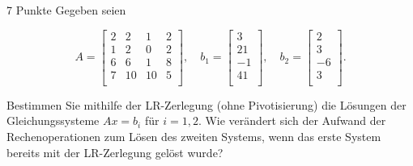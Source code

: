 \documentclass{problemset}
\author{Michael van Straten}
\begin{document}
\maketitle

\setcounter{problem}{3}

\begin{problem}{7 Punkte}
Gegeben seien

\[
    A =
    \begin{bmatrix}
        2 & 2  & 1  & 2 \\
        1 & 2  & 0  & 2 \\
        6 & 6  & 1  & 8 \\
        7 & 10 & 10 & 5 \\
    \end{bmatrix}, \quad
    b_1 =
    \begin{bmatrix}
        3  \\
        21 \\
        -1 \\
        41 \\
    \end{bmatrix}, \quad
    b_2 =
    \begin{bmatrix}
        2  \\
        3  \\
        -6 \\
        3  \\
    \end{bmatrix}.
\]

Bestimmen Sie mithilfe der LR-Zerlegung (ohne Pivotisierung) die Lösungen der
Gleichungssysteme \(Ax = b_i\) für \(i = 1, 2\). Wie verändert sich der Aufwand
der Rechenoperationen zum Lösen des zweiten Systems, wenn das erste System
bereits mit der LR-Zerlegung gelöst wurde?
\end{problem}
\end{document}
